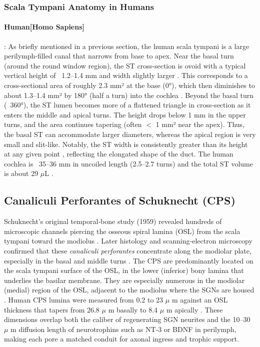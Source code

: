 \subsubsection{Scala Tympani Anatomy in Humans}
\paragraph{Human[Homo Sapiens]}
:  As briefly mentioned in a previous section, the human scala tympani is a large perilymph-filled canal that narrows from base to apex. Near the basal turn (around the round window region), the ST cross-section is ovoid with a typical vertical height of ~1.2–1.4 mm and width slightly larger \cite{fujiwara2023morphometric}. This corresponds to a cross-sectional area of roughly 2.3 mm² at the base (0°), which then diminishes to about 1.3–1.4 mm² by 180° (half a turn) into the cochlea \cite{fujiwara2023morphometric}. Beyond the basal turn (~360°), the ST lumen becomes more of a flattened triangle in cross-section as it enters the middle and apical turns. The height drops below 1 mm in the upper turns, and the area continues tapering (often $<$ 1 mm² near the apex). Thus, the basal ST can accommodate larger diameters, whereas the apical region is very small and slit-like. Notably, the ST width is consistently greater than its height at any given point \cite{hatsushika1990dimensions}, reflecting the elongated shape of the duct. The human cochlea is ~35–36 mm in uncoiled length (2.5–2.7 turns) and the total ST volume is about 29 $\mu$L \cite{Liu2023FEA}.

\subsection{Canaliculi Perforantes of Schuknecht (CPS)}  
Schuknecht’s original temporal‑bone study (1959) revealed hundreds of microscopic channels piercing the osseous spiral lamina (OSL) from the scala tympani toward the modiolus \cite{schuknecht1959}.  Later histology and scanning‑electron microscopy confirmed that these \textit{canaliculi perforantes} concentrate along the modiolar plate, especially in the basal and middle turns \cite{Schuknecht1963,lim1970,sando1971,masuda1971,tanaka1973}. The CPS are predominantly located on the scala tympani surface of the OSL, in the lower (inferior) bony lamina that underlies the basilar membrane. They are especially numerous in the modiolar (medial) region of the OSL, adjacent to the modiolus where the SGNs are housed \cite{shepherd2004}. Human CPS lumina were measured from 0.2 to 23 $\mu$ m against an OSL thickness that tapers from 26.8 $\mu$ m basally to 8.4 $\mu$ m apically \cite{shepherd2004}.  These dimensions overlap both the caliber of regenerating SGN neurites and the 10--30 $\mu$ m diffusion length of neurotrophins such as NT‑3 or BDNF in perilymph, making each pore a matched conduit for axonal ingress and trophic support.

